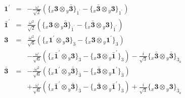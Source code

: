 \documentclass[english]{article}
\newcommand{\rep}[1]{\mathbf{#1}}
\newcommand{\repx}[2]{{}_{#2}\mathbf{#1}}
\newcommand{\subcg}[3]{\big\{ \repx{#1}{x}\otimes\repx{#2}{y}\big\}^{}_{#3}}
\begin{document}
\begin{itemize}
\begin{eqnarray*}
\rep{1^{\prime}} &=& -\frac{\omega }{\sqrt{2}}\left(\subcg{3}{\bar{3}}{1^{\prime}}-\subcg{\bar{3}}{3}{1^{\prime}}\right)
\\
\rep{\bar{1}^{\prime}} &=& \frac{\omega ^2}{\sqrt{2}}\left(\subcg{3}{\bar{3}}{\bar{1}^{\prime}}-\subcg{\bar{3}}{3}{\bar{1}^{\prime}}\right)
\\
\rep{3} &=& \frac{\omega ^2}{\sqrt{6}}\left(\subcg{1^{\prime}}{3}{3}-\subcg{3}{1^{\prime}}{3}\right) \\ 
 & & -\frac{\omega }{\sqrt{6}}\left(\subcg{\bar{1}^{\prime}}{3}{3}-\subcg{3}{\bar{1}^{\prime}}{3}\right)-\frac{i}{\sqrt{3}}\subcg{\bar{3}}{\bar{3}}{3_{a}}
\\
\rep{\bar{3}} &=& -\frac{\omega ^2}{\sqrt{6}}\left(\subcg{1^{\prime}}{\bar{3}}{\bar{3}}-\subcg{\bar{3}}{1^{\prime}}{\bar{3}}\right) \\ 
 & & +\frac{\omega }{\sqrt{6}}\left(\subcg{\bar{1}^{\prime}}{\bar{3}}{\bar{3}}-\subcg{\bar{3}}{\bar{1}^{\prime}}{\bar{3}}\right)+\frac{i}{\sqrt{3}}\subcg{3}{3}{\bar{3}_{a}}
\end{eqnarray*}
\end{itemize}
\end{document}
